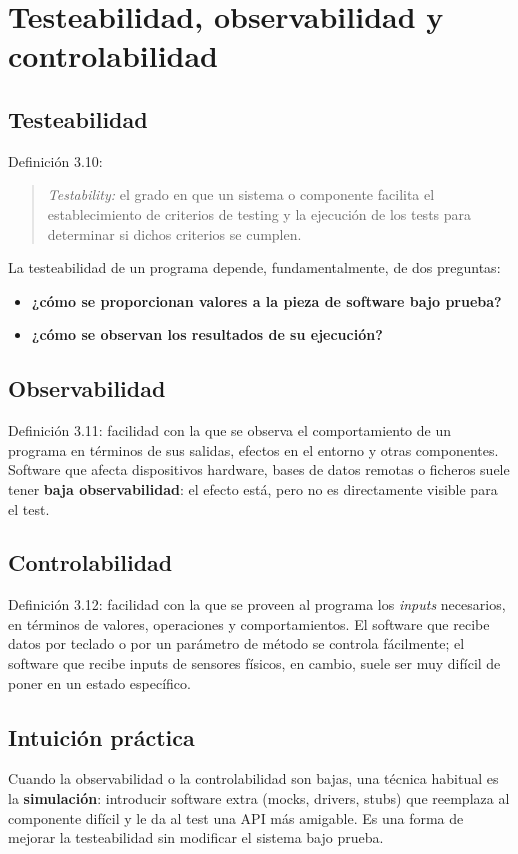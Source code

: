 \documentclass[12pt,a4paper]{article}
\begin{document}
\section{Testeabilidad, observabilidad y controlabilidad}

\subsection{Testeabilidad}
Definición 3.10:
\begin{quote}
\textit{Testability:} el grado en que un sistema o componente facilita el establecimiento de criterios de testing y la ejecución de los tests para determinar si dichos criterios se cumplen.
\end{quote}
La testeabilidad de un programa depende, fundamentalmente, de dos preguntas:
\begin{itemize}
  \item \textbf{¿cómo se proporcionan valores a la pieza de software bajo prueba?}
  \item \textbf{¿cómo se observan los resultados de su ejecución?}
\end{itemize}

\subsection{Observabilidad}
Definición 3.11: facilidad con la que se observa el comportamiento de un programa en términos de sus salidas, efectos en el entorno y otras componentes. Software que afecta dispositivos hardware, bases de datos remotas o ficheros suele tener \textbf{baja observabilidad}: el efecto está, pero no es directamente visible para el test.

\subsection{Controlabilidad}
Definición 3.12: facilidad con la que se proveen al programa los \textit{inputs} necesarios, en términos de valores, operaciones y comportamientos. El software que recibe datos por teclado o por un parámetro de método se controla fácilmente; el software que recibe inputs de sensores físicos, en cambio, suele ser muy difícil de poner en un estado específico.

\subsection{Intuición práctica}
Cuando la observabilidad o la controlabilidad son bajas, una técnica habitual es la \textbf{simulación}: introducir software extra (mocks, drivers, stubs) que reemplaza al componente difícil y le da al test una API más amigable. Es una forma de mejorar la testeabilidad sin modificar el sistema bajo prueba.
\end{document}
